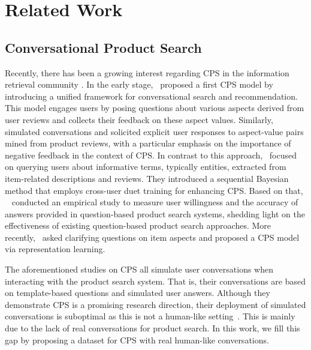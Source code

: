\section{Related Work}
\subsection{Conversational Product Search}
Recently, there has been a growing interest regarding \ac{CPS} in the information retrieval community \cite{javadi2023opinionconv, montazeralghaem2022learning, papenmeier2023ah, ye2024productagent, li2025wizard}. In the early stage,~\citet{zhang2018towards} proposed a first \ac{CPS} model by introducing a unified framework for conversational search and recommendation. %
This model engages users by posing questions about various aspects derived from user reviews and collects their feedback on these aspect values. Similarly,~\citet{bi2019conversational} simulated conversations and solicited explicit user responses to aspect-value pairs mined from product reviews, with a particular emphasis on the importance of negative feedback in the context of \ac{CPS}. In contrast to this approach,~\citet{zou2019learning} focused on querying users about informative terms, typically entities, extracted from item-related descriptions and reviews. They introduced a sequential Bayesian method that employs cross-user duet training for enhancing \ac{CPS}. Based on that, ~\citet{zou2020empirical} conducted an empirical study to measure user willingness and the accuracy of answers provided in question-based product search systems, shedding light on the effectiveness of existing question-based product search approaches. More recently,~\citet{zou2022learning} asked clarifying questions \cite{vedula2024question} on item aspects and proposed a \ac{CPS} model via representation learning. 

The aforementioned studies on \ac{CPS} all simulate user conversations when interacting with the product search system. That is, their conversations are based on template-based questions and simulated user answers. Although they demonstrate CPS is a promising research direction,
their deployment of simulated conversations is suboptimal as this is not a human-like setting~\cite{zou2022learning}. This is mainly due to the lack of real conversations for product search. In this work, we fill this gap by proposing a dataset for \ac{CPS} with real human-like conversations. 
